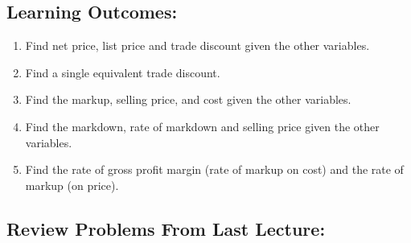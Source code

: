 \documentclass[
]{book}
\providecommand{\tightlist}{%
  \setlength{\itemsep}{0pt}\setlength{\parskip}{0pt}}
\begin{document}
\subsection*{Learning Outcomes:}\label{learning-outcomes-3}

\begin{enumerate}
\def\labelenumi{\arabic{enumi}.}
\tightlist
\item
  Find net price, list price and trade discount given the other variables.
\item
  Find a single equivalent trade discount.
\item
  Find the markup, selling price, and cost given the other variables.
\item
  Find the markdown, rate of markdown and selling price given the other variables.
\item
  Find the rate of gross profit margin (rate of markup on cost) and the rate of markup (on price).
\end{enumerate}

\subsection*{Review Problems From Last Lecture:}\label{review-problems-from-last-lecture-2}
\end{document}

